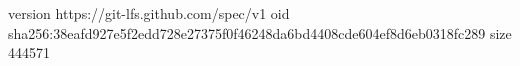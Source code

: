 version https://git-lfs.github.com/spec/v1
oid sha256:38eafd927e5f2edd728e27375f0f46248da6bd4408cde604ef8d6eb0318fc289
size 444571

